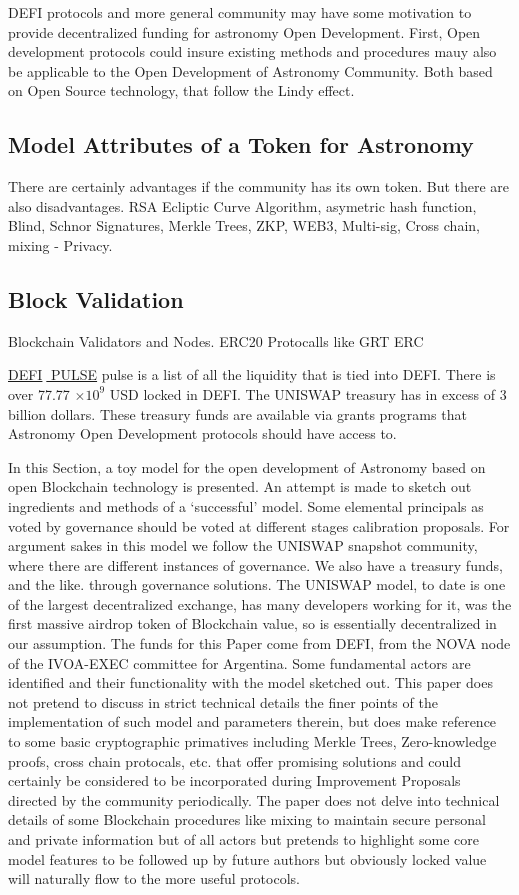 \documentclass[final,5p,times,twocolumn,authoryear]{elsarticle}
\begin{document}
DEFI protocols and more general community may have some motivation to provide decentralized funding for astronomy Open Development. First, Open development protocols could insure existing methods and procedures mauy also be applicable to the Open Development of Astronomy Community. Both  based on Open Source technology, that follow the Lindy effect.
 
\subsection{Model Attributes of a Token for Astronomy}
\label{subsec:btc4}
There are certainly advantages if the community has its own token. But there are also disadvantages. RSA Ecliptic Curve Algorithm, asymetric hash function, Blind, Schnor Signatures, Merkle Trees, ZKP,  WEB3, Multi-sig, Cross chain, mixing - Privacy. 

\subsection{Block Validation}
\label{subsec: validator}
Blockchain Validators and Nodes. ERC20 Protocalls like GRT ERC   

\href{https://defipulse.com/}{DEFI$\;$ PULSE} pulse is a list of all the liquidity that is tied into DEFI. There is over 77.77 $\times 10^{9}$ USD locked in DEFI. The UNISWAP treasury has in excess of 3 billion dollars. These treasury funds are available via grants programs that Astronomy Open Development protocols should have access to.

In this Section, a toy model for the open development of Astronomy based on open Blockchain technology is presented. An attempt is made to sketch out ingredients and methods of a `successful' model. Some elemental principals as voted by governance should be voted at different stages calibration proposals. For argument sakes in this model we follow the UNISWAP snapshot community, where there are different instances of governance. We also have a treasury funds, and the like.  through governance solutions. The UNISWAP model, to date is one of the largest decentralized exchange, has many developers working for it, was the first massive airdrop token of Blockchain value, so is essentially decentralized in our assumption. The funds for this Paper come from DEFI, from the NOVA node of the IVOA-EXEC committee for Argentina. Some fundamental actors are identified and their functionality with the model sketched out. This paper does not pretend to discuss in strict technical details the finer points of the implementation of such model and parameters therein, but does make reference to some basic cryptographic primatives including Merkle Trees, Zero-knowledge proofs, cross chain protocals, etc. that offer promising solutions and could certainly be considered to be incorporated during Improvement Proposals directed by the community periodically. The paper does not delve into technical details of some Blockchain procedures like mixing to maintain secure personal and private information but of all actors but pretends to highlight some core model features to be followed up by future authors but obviously  locked value will naturally flow to the more useful protocols.  
 
\end{document}

